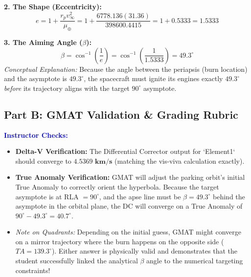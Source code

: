 \documentclass[12pt]{article}
\begin{document}
\textbf{2. The Shape (Eccentricity):}
\begin{equation*}
    e = 1 + \frac{r_p v_\infty^2}{\mu_\oplus} = 1 + \frac{6778.136 (31.36)}{398600.4415} = 1 + 0.5333 = \mathbf{1.5333}
\end{equation*}

\textbf{3. The Aiming Angle ($\beta$):}
\begin{equation*}
    \beta = \cos^{-1}\left(\frac{1}{e}\right) = \cos^{-1}\left(\frac{1}{1.5333}\right) = \mathbf{49.3^\circ}
\end{equation*}
\textit{Conceptual Explanation:} Because the angle between the periapsis (burn location) and the asymptote is $49.3^\circ$, the spacecraft must ignite its engines exactly $49.3^\circ$ \textit{before} its trajectory aligns with the target $90^\circ$ asymptote.

\subsection*{Part B: GMAT Validation \& Grading Rubric}
\textcolor{blue}{\textbf{Instructor Checks:}}
\begin{itemize}
    \item \textbf{Delta-V Verification:} The Differential Corrector output for `Element1` should converge to $\mathbf{4.5369 \text{ km/s}}$ (matching the vis-viva calculation exactly).
    \item \textbf{True Anomaly Verification:} GMAT will adjust the parking orbit's initial True Anomaly to correctly orient the hyperbola. Because the target asymptote is at RLA $= 90^\circ$, and the apse line must be $\beta = 49.3^\circ$ behind the asymptote in the orbital plane, the DC will converge on a True Anomaly of $90^\circ - 49.3^\circ = \mathbf{40.7^\circ}$. 
    \item \textit{Note on Quadrants:} Depending on the initial guess, GMAT might converge on a mirror trajectory where the burn happens on the opposite side ($TA = 139.3^\circ$). Either answer is physically valid and demonstrates that the student successfully linked the analytical $\beta$ angle to the numerical targeting constraints!
\end{itemize}
\end{document}
